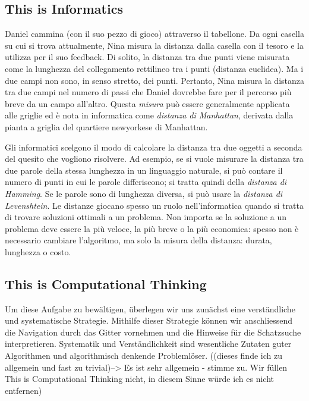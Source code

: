 \documentclass[a4paper,11pt]{report}
\begin{document}
\subsection*{This is Informatics}

Daniel cammina (con il suo pezzo di gioco) attraverso il tabellone. Da ogni casella su cui si trova attualmente, Nina misura la distanza dalla casella con il tesoro e la utilizza per il suo feedback.  Di solito, la distanza tra due punti viene misurata come la lunghezza del collegamento rettilineo tra i punti (distanza euclidea).  Ma i due campi non sono, in senso stretto, dei punti. Pertanto, Nina misura la distanza tra due campi nel numero di passi che Daniel dovrebbe fare per il percorso più breve da un campo all’altro.  Questa \emph{misura} può essere generalmente applicata alle griglie ed è nota in informatica come \emph{distanza di Manhattan}, derivata dalla pianta a griglia del quartiere newyorkese di Manhattan.

Gli informatici scelgono il modo di calcolare la distanza tra due oggetti a seconda del quesito che vogliono risolvere. Ad esempio, se si vuole misurare la distanza tra due parole della stessa lunghezza in un linguaggio naturale, si può contare il numero di punti in cui le parole differiscono; si tratta quindi della \emph{distanza di Hamming}.  Se le parole sono di lunghezza diversa, si può usare la \emph{distanza di Levenshtein}. Le distanze giocano spesso un ruolo nell’informatica quando si tratta di trovare soluzioni ottimali a un problema.  Non importa se la soluzione a un problema deve essere la più veloce, la più breve o la più economica:  spesso non è necessario cambiare l’algoritmo, ma solo la misura della distanza: durata, lunghezza o costo.


\subsection*{This is Computational Thinking}

Um diese Aufgabe zu bewältigen, überlegen wir uns zunächst eine verständliche und systematische Strategie. Mithilfe dieser Strategie können wir anschliessend die Navigation durch das Gitter vornehmen und die Hinweise für die Schatzsuche interpretieren. Systematik und Verständlichkeit sind wesentliche Zutaten guter Algorithmen und algorithmisch denkende Problemlöser. ((dieses finde ich zu allgemein und fast zu trivial)–> Es ist sehr allgemein - stimme zu. Wir füllen This is Computational Thinking nicht, in diesem Sinne würde ich es nicht entfernen)
\end{document}
